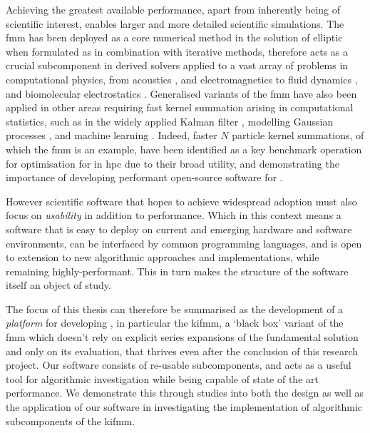 Achieving the greatest available performance, apart from inherently being of scientific interest, enables larger and more detailed scientific simulations. The \acrshort{fmm} has been deployed as a core numerical method in the solution of elliptic  when formulated as  in combination with iterative methods, therefore acts as a crucial subcomponent in derived solvers applied to a vast array of problems in computational physics, from acoustics \cite{hao2015efficient}, and electromagnetics \cite{darve2004fast} to fluid dynamics \cite{darve2004fast}, and biomolecular electrostatics \cite{yokota2011biomolecular, wang2021high}. Generalised variants of the \acrshort{fmm} have also been applied in other areas requiring fast kernel summation arising in computational statistics, such as in the widely applied Kalman filter \cite{li2014kalman}, modelling Gaussian processes \cite{ambikasaran2014fast}, and machine learning \cite{gray2000n, march2017far}. Indeed, faster $N$ particle kernel summations, of which the \acrshort{fmm} is an example, have been identified as a key benchmark operation for optimisation for in \acrshort{hpc} \cite{asanovic2006landscape} due to their broad utility, and demonstrating the importance of developing performant open-source software for .

However scientific software that hopes to achieve widespread adoption must also focus on \textit{usability} in addition to performance. Which in this context means a software that is easy to deploy on current and emerging hardware and software environments, can be interfaced by common programming languages, and is open to extension to new algorithmic approaches and implementations, while remaining highly-performant. This in turn makes the structure of the software itself an object of study.

The focus of this thesis can therefore be summarised as the development of a \textit{platform} for developing , in particular the \acrfull{kifmm}, a `black box' variant of the \acrshort{fmm} which doesn't rely on explicit series expansions of the fundamental solution and only on its evaluation, that thrives even after the conclusion of this research project. Our software consists of re-usable subcomponents, and acts as a useful tool for algorithmic investigation while being capable of state of the art performance. We demonstrate this through studies into both the design as well as the application of our software in investigating the implementation of algorithmic subcomponents of the \acrshort{kifmm}.

